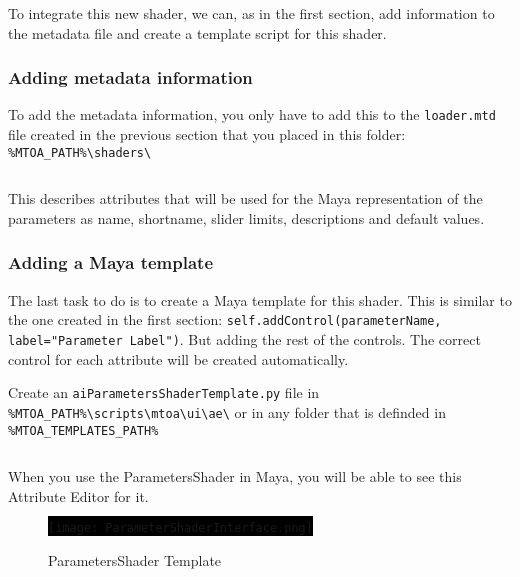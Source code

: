To integrate this new shader, we can, as in the first section, add information to the
metadata file and create a template script for this shader.

\subsubsection{Adding metadata information}

To add the metadata information, you only have to add this to the \texttt{loader.mtd} file created in the previous section that you placed in this folder:\\
\verb|%MTOA_PATH%\shaders\|\\

\inputminted[mathescape,
linenos,
numbersep=5pt,
frame=lines,
framesep=2mm,
baselinestretch=1,
fontsize=\footnotesize,
tabsize=3,
label=loader.mtd,
firstline=25,
firstnumber=25]
{mtd}{loader2.mtd}

This describes attributes that will be used for the Maya representation of the parameters as name,
shortname, slider limits, descriptions and default values.

\subsubsection{Adding a Maya template}

The last task to do is to create a Maya template for this shader. This is similar to the one created
in the first section: \texttt{self.addControl(parameterName, label="Parameter Label")}.
But adding the rest of the controls. The correct control for each attribute will
be created automatically.

Create an \texttt{aiParametersShaderTemplate.py} file in\\
\verb|%MTOA_PATH%\scripts\mtoa\ui\ae\| or in any folder that is definded in \verb|%MTOA_TEMPLATES_PATH%|
\\

\inputminted[mathescape,
linenos,
numbersep=5pt,
frame=lines,
framesep=2mm,
baselinestretch=1,
fontsize=\footnotesize,
tabsize=3,
label=aiParametersShaderTemplate.py]
{python}{aiParametersShaderTemplate.py}

When you use the ParametersShader in Maya, you will be able to see this Attribute Editor for it.

\begin{figure}[H]
\centering
\colorbox{black}{\texttt{[image: ParameterShaderInterface.png]}}
\caption{ParametersShader Template}
\label{ParametersShaderTemplate}
\end{figure}

